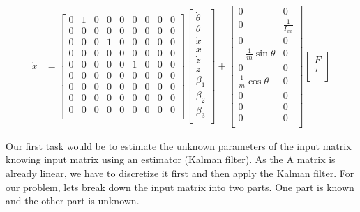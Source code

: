 \documentclass[12pt]{article}
\begin{document}
\begin{align*}
    \dot{x} &= \begin{bmatrix}
        0 & 1 & 0 & 0 & 0 & 0 & 0 & 0 & 0 \\
        0 & 0 & 0 & 0 & 0 & 0 & 0 & 0 & 0 \\
        0 & 0 & 0 & 1 & 0 & 0 & 0 & 0 & 0 \\
        0 & 0 & 0 & 0 & 0 & 0 & 0 & 0 & 0 \\
        0 & 0 & 0 & 0 & 0 & 1 & 0 & 0 & 0 \\
        0 & 0 & 0 & 0 & 0 & 0 & 0 & 0 & 0 \\
        0 & 0 & 0 & 0 & 0 & 0 & 0 & 0 & 0 \\
        0 & 0 & 0 & 0 & 0 & 0 & 0 & 0 & 0 \\
        0 & 0 & 0 & 0 & 0 & 0 & 0 & 0 & 0 \\
    \end{bmatrix} \begin{bmatrix}
        \dot{\theta} \\
        \theta \\
        \dot{x} \\
        x \\
        \dot{z} \\
        z \\
        \beta_1 \\
        \beta_2 \\
        \beta_3 \\
    \end{bmatrix} + \begin{bmatrix}
        0 & 0 \\
        0 & \frac{1}{I_{xx}} \\
        0 & 0 \\
        - \frac{1}{m} \sin{\theta} & 0 \\
        0 & 0 \\
        \frac{1}{m} \cos{\theta} & 0 \\
        0 & 0 \\
        0 & 0 \\
        0 & 0 \\
    \end{bmatrix} \begin{bmatrix}
        F \\
        \tau \\
    \end{bmatrix} 
\end{align*}

Our first task would be to estimate the unknown parameters of the input matrix knowing input matrix using an estimator (Kalman filter). As the A matrix is already linear, we have to discretize it first and then apply the Kalman filter. For our problem, lets break down the input matrix into two parts. One part is known and the other part is unknown.
\end{document}
